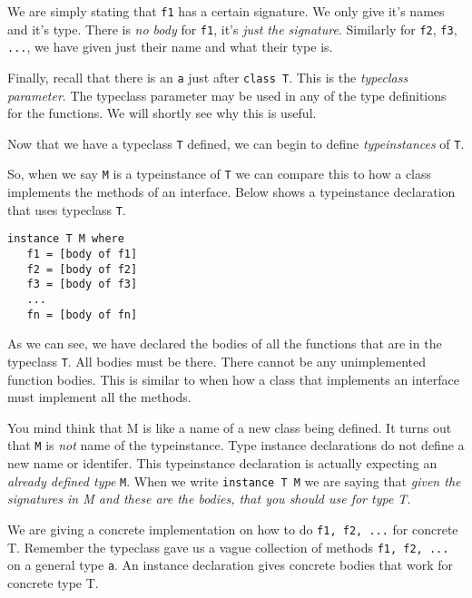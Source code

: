 We are simply stating that \lstinline{f1}
has a certain signature. We only give it's names and it's type. 
There is \textit{no body} for \lstinline{f1}, it's \textit{just the signature}. 
Similarly for \lstinline{f2}, \lstinline{f3}, \lstinline{...}, we have given just their name 
and what their type is.

Finally, recall that there is an \lstinline{a} just after \lstinline{class T}. 
This is the \textit{typeclass parameter}. The typeclass parameter may be used in any of the 
type definitions for the functions. We will shortly see why this is useful. 

Now that we have a typeclass \lstinline{T} defined, we can begin to define 
\textit{typeinstances} of \lstinline{T}. 


So, when we say \lstinline{M} is a typeinstance of \lstinline{T} 
we can compare this to how a class implements the methods of an interface. 
Below shows a typeinstance declaration that uses typeclass \lstinline{T}.

\begin{lstlisting}
instance T M where
   f1 = [body of f1]
   f2 = [body of f2]
   f3 = [body of f3]
   ...
   fn = [body of fn]
\end{lstlisting}

As we can see, we have declared the bodies of all the functions that are in 
the typeclass \lstinline{T}. All bodies must be there. 
There cannot be any unimplemented function bodies. This is similar to 
when how a class that implements an interface must implement all the methods.

You mind think that M is like a name of a new class being defined. 
It turns out that \lstinline{M} is \textit{not} name of the typeinstance. 
Type instance declarations do not define a new name or identifer.
This typeinstance declaration is actually expecting 
an \textit{already defined type} \lstinline{M}.
When we write \lstinline{instance T M} we are saying
that \textit{given the signatures in M and these are the bodies, 
that you should use for type T}. 

We are giving a concrete implementation on how to do  \lstinline{f1, f2, ...} 
for concrete T. Remember the typeclass gave us a vague collection 
of methods \lstinline{f1, f2, ...} on a general type \lstinline{a}. 
An instance declaration gives concrete bodies that work for concrete type T.

